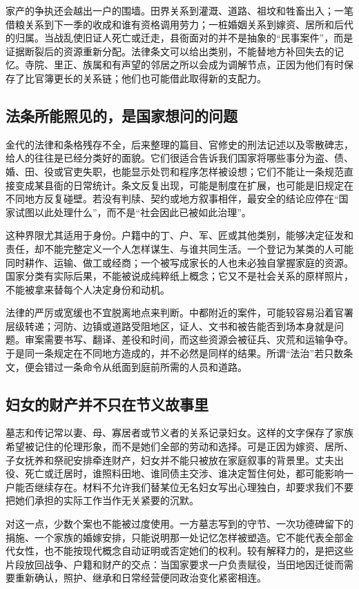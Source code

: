 家产的争执还会越出一户的围墙。田界关系到灌溉、道路、祖坟和牲畜出入；一笔借粮关系到下一季的收成和谁有资格调用劳力；一桩婚姻关系到嫁资、居所和后代的归属。当战乱使旧证人死亡或迁走，县衙面对的并不是抽象的“民事案件”，而是证据断裂后的资源重新分配。法律条文可以给出类别，不能替地方补回失去的记忆。寺院、里正、族属和有声望的邻居之所以会成为调解节点，正因为他们有时保存了比官簿更长的关系链；他们也可能借此取得新的支配力。

\subsection{法条所能照见的，是国家想问的问题}

金代的法律和条格残存不全，后来整理的篇目、官修史的刑法记述以及零散碑志，给人的往往是已经分类好的面貌。它们很适合告诉我们国家将哪些事分为盗、债、婚、田、役或官吏失职，也能显示处罚和程序怎样被设想；它们不能让一条规范直接变成某县衙的日常统计。条文反复出现，可能是制度在扩展，也可能是旧规定在不同地方反复碰壁。若没有判牍、契约或地方叙事相伴，最安全的结论应停在“国家试图以此处理什么”，而不是“社会因此已被如此治理”。

这种界限尤其适用于身份。户籍中的丁、户、军、匠或其他类别，能够决定征发和责任，却不能完整定义一个人怎样谋生、与谁共同生活。一个登记为某类的人可能同时耕作、运输、做工或经商；一个被写成家长的人也未必独自掌握家庭的资源。国家分类有实际后果，不能被说成纯粹纸上概念；它又不是社会关系的原样照片，不能被拿来替每个人决定身份和动机。

法律的严厉或宽缓也不宜脱离地点来判断。中都附近的案件，可能较容易沿着官署层级转递；河防、边镇或道路受阻地区，证人、文书和被告能否到场本身就是问题。审案需要书写、翻译、差役和时间，而这些资源会被征兵、灾荒和运输争夺。于是同一条规定在不同地方造成的，并不必然是同样的结果。所谓“法治”若只数条文，便会错过一条命令从纸面到庭前所需的人员和道路。

\subsection{妇女的财产并不只在节义故事里}

墓志和传记常以妻、母、寡居者或节义者的关系记录妇女。这样的文字保存了家族希望被记住的伦理形象，而不是她们全部的劳动和选择。可是正因为嫁资、居所、子女抚养和祭祀安排牵连财产，妇女并不能只被放在家庭叙事的背景里。丈夫出役、死亡或迁居时，谁照料田地、谁同债主交涉、谁决定暂住何处，都可能影响一户能否继续存在。材料不允许我们替某位无名妇女写出心理独白，却要求我们不要把她们承担的实际工作当作无关紧要的沉默。

对这一点，少数个案也不能被过度使用。一方墓志写到的守节、一次功德碑留下的捐施、一个家族的婚嫁安排，只能说明那一处记忆怎样被塑造。它不能代表全部金代女性，也不能按现代概念自动证明或否定她们的权利。较有解释力的，是把这些片段放回战争、户籍和财产的交点：当国家要求一户负责赋役，当田地因迁徙而需要重新确认，照护、继承和日常经营便同政治变化紧密相连。

